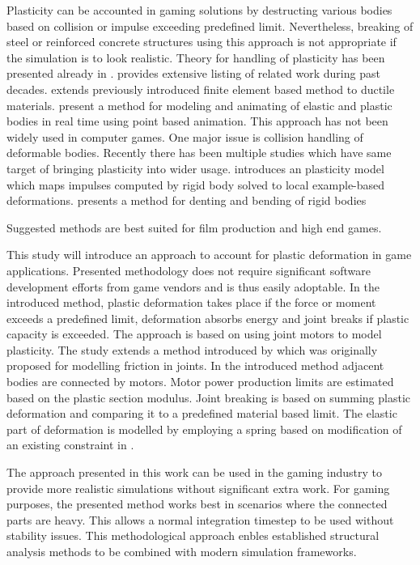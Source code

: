 Plasticity can be  accounted in gaming solutions by destructing various bodies based on collision
or impulse exceeding predefined limit.
Nevertheless, breaking of steel or reinforced concrete structures using this approach 
is not appropriate if the simulation is to look realistic. Theory for handling of plasticity 
has been presented already in \cite{cg1988}. 
\cite{Jones:2016:EPD} provides extensive listing of related work during past decades.
\cite{Obrien:2002:GMA} extends previously introduced finite element based method \cite{Obrien:1999:GMA}
to ductile materials.
\cite{muller2005meshless} 
present a method for modeling and animating of elastic and plastic bodies in real time using 
point based animation. This approach has not been widely used in computer games.  
One major issue is collision handling of deformable bodies.
Recently there has been multiple studies which have same target of bringing plasticity 
into wider usage.
\cite{Jones:2016:EPD} introduces an plasticity model which
maps impulses computed by rigid body solved to local example-based deformations.
\cite{Patkar:2015:EDB} presents a method for denting and bending of rigid bodies

\cite{Budsberg:2014:EPD}
Suggested methods are best suited for film production and high end games.

This study will introduce an approach to account for plastic deformation in game applications.   
Presented methodology does not require significant software development efforts from
game vendors and is thus easily adoptable. 
In the introduced method, plastic deformation takes place if the force or moment exceeds a predefined 
limit, deformation absorbs energy and joint breaks if plastic capacity is exceeded. 
The approach is based on using joint motors to model plasticity. 
The study extends a method introduced by
\cite{erleben.thesis} 
which was originally proposed for modelling friction in joints. 
In the introduced method adjacent bodies are connected by motors. 
Motor power production limits are estimated based on the plastic section modulus. 
Joint breaking is based on summing plastic deformation and comparing it to a
predefined material based limit. The elastic part of deformation is modelled by employing 
a spring based on modification of an existing constraint in \cbullet.

The approach presented in this work can be used in the gaming industry to provide more realistic 
simulations without significant extra work. For gaming purposes, the presented method works 
best in scenarios where the connected parts are heavy. This allows a normal 
integration timestep to be used without stability issues. 
This methodological approach enbles established structural analysis
methods to be combined with modern simulation frameworks.

